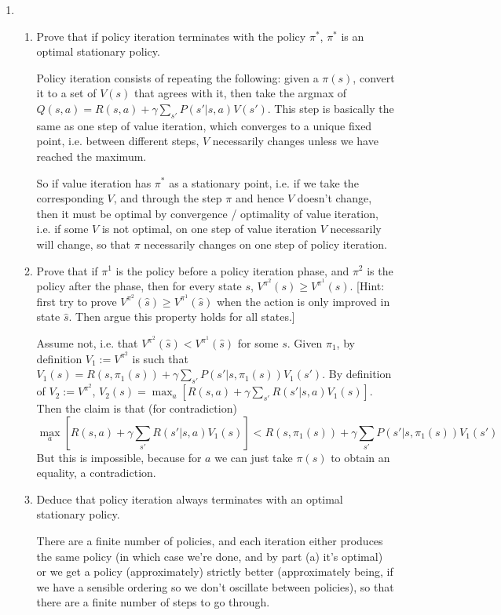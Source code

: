 \documentclass{article}
\begin{document}
\begin{enumerate}
\begin{enumerate}
  \end{enumerate}

\item 
  \begin{enumerate}
  \item {Prove that if policy iteration terminates with the policy
  $\pi^*$, $\pi^*$ is an optimal stationary policy.}

  Policy iteration consists of repeating the following: given a $\pi(s)$,
  convert it to a set of $V(s)$ that agrees with it, then take the
  argmax of $Q(s,a)=R(s,a)+\gamma \sum_{s'} P(s'|s,a)V(s')$. This step
  is basically the same as one step of value iteration, which converges
  to a unique fixed point, i.e. between different steps, $V$ necessarily
  changes unless we have reached the maximum. 

  So if value iteration has $\pi^*$ as a 
  stationary point, i.e. if we take the corresponding $V$, and through 
  the step $\pi$ and hence $V$ doesn't change, then it must be optimal
  by convergence / optimality of value iteration, i.e. if some $V$ is 
  not optimal, on one step of value iteration $V$ necessarily will change,
  so that $\pi$ necessarily changes on one step of policy iteration. 

  \item {Prove that if $\pi^1$ is the policy before a policy iteration
  phase, and $\pi^2$ is the policy after the phase, then for every state $s$,
  $V^{\pi^2}(s)\geq V^{\pi^1}(s)$. [Hint: first try to prove $V^{\pi^2}(\hat s)\geq V^{\pi^1}(\hat s)$
  when the action is only improved in state $\hat s$. Then argue this property
  holds for all states.]}

  Assume not, i.e. that $V^{\pi^2}(\hat s)<V^{\pi^1}(\hat s)$ for some $s$.
  Given $\pi_1$, by definition $V_1:=V^{\pi^2}$ is such that
  $V_1(s)=R(s,\pi_1(s))+\gamma \sum_{s'}P(s'|s,\pi_1(s))V_1(s')$.
  By definition of $V_2:=V^{\pi^2}$, $V_2(s)=\max_a \left[R(s,a)+\gamma \sum_{s'}R(s'|s,a)V_1(s)\right]$.
  Then the claim is that (for contradiction)
  $$\max_a \left[R(s,a)+\gamma \sum_{s'}R(s'|s,a)V_1(s)\right] < R(s,\pi_1(s))+\gamma \sum_{s'}P(s'|s,\pi_1(s))V_1(s')$$
  But this is impossible, because for $a$ we can just take $\pi(s)$ to obtain
  an equality, a contradiction. 


  \item {Deduce that policy iteration always terminates with an
  optimal stationary policy.}
  
  There are a finite number of policies, and each iteration either produces
  the same policy (in which case we're done, and by part (a) it's optimal)
  or we get a policy (approximately) strictly better (approximately being, 
  if we have a sensible ordering so we don't oscillate between policies), so
  that there are a finite number of steps to go through. 


\end{enumerate}
\end{enumerate}
\end{document}
